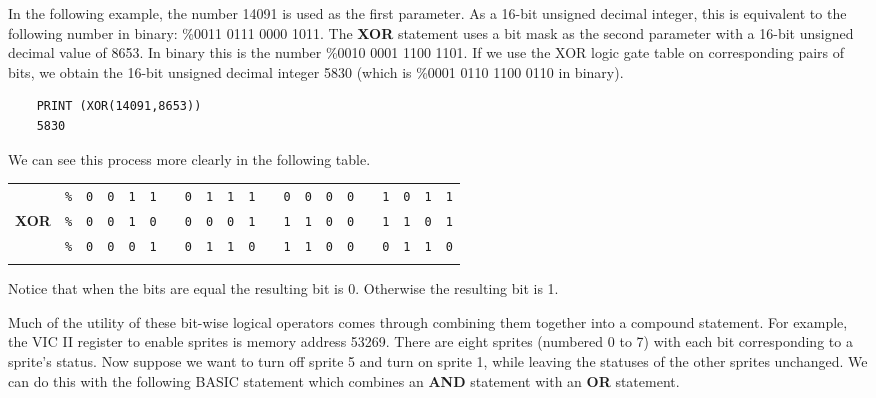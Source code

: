 In the following example, the number 14091 is used as the first parameter.
As a 16-bit unsigned decimal integer, this is equivalent to the following
number in binary: \%0011 0111 0000 1011. The {\bf XOR} statement uses a
bit mask as the second parameter with a 16-bit unsigned decimal value of
8653. In binary this is the number \%0010 0001 1100 1101. If we use the
XOR logic gate table on corresponding pairs of bits, we obtain the 16-bit
unsigned decimal integer 5830 (which is \%0001 0110 1100 0110 in binary).

\begin{tcolorbox}[colback=black,coltext=white]
\verbatimfont{\codefont}
\begin{verbatim}
	PRINT (XOR(14091,8653))
	5830
\end{verbatim}
\end{tcolorbox}

We can see this process more clearly in the following table.

\begin{center}
	\begin{tabular}{ccccccccccccccccccccc}
	  & \texttt{\%} & \texttt{0} & \texttt{0} & \texttt{1} & \texttt{1} & & \texttt{0} & \texttt{1} & \texttt{1} & \texttt{1} & & \texttt{0} & \texttt{0} & \texttt{0} & \texttt{0} & & \texttt{1} & \texttt{0} & \texttt{1} & \texttt{1} \\
	  {\bf XOR} & \texttt{\%} & \texttt{0} & \texttt{0} & \texttt{1} & \texttt{0} & &  \texttt{0} & \texttt{0} & \texttt{0} & \texttt{1} &  & \texttt{1} & \texttt{1} & \texttt{0} & \texttt{0} & & \texttt{1} & \texttt{1} & \texttt{0} & \texttt{1} \\ \hline
	  & \texttt{\%} & \texttt{0} & \texttt{0} & \texttt{0} & \texttt{1} & & \texttt{0} & \texttt{1} & \texttt{1} & \texttt{0} & &  \texttt{1} & \texttt{1} & \texttt{0} & \texttt{0} & & \texttt{0} & \texttt{1} & \texttt{1} & \texttt{0} \\ \hhline{=====================}
	  \end{tabular}
\end{center}

Notice that when the bits are equal the resulting bit is 0.
Otherwise the resulting bit is 1.

Much of the utility of these bit-wise logical operators comes through
combining them together into a compound statement. For example, the
VIC II register to enable sprites is memory address 53269. There are
eight sprites (numbered 0 to 7) with each bit corresponding to
a sprite's status. Now suppose we want to turn off sprite 5 and turn on
sprite 1, while leaving the statuses of the other sprites unchanged.
We can do this with the following BASIC statement which combines an
{\bf AND} statement with an {\bf OR} statement.

